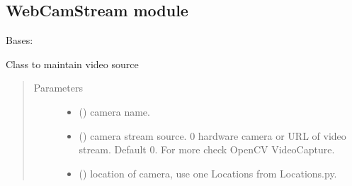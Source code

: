 \documentclass[letterpaper,10pt,english]{sphinxmanual}
\begin{document}
\subsection{WebCamStream module}
\label{\detokenize{doc/VideoStream/WebCamStream:module-WebCamStream}}\label{\detokenize{doc/VideoStream/WebCamStream:webcamstream-module}}\label{\detokenize{doc/VideoStream/WebCamStream::doc}}

\begin{fulllineitems}
\label{\detokenize{doc/VideoStream/WebCamStream:WebCamStream.WebCamStream}}
Bases: 

Class to maintain video source
\begin{quote}\begin{description}
\item[{Parameters}] \leavevmode\begin{itemize}
\item {} 
 () \textendash{} camera name.

\item {} 
 () \textendash{} camera stream source. 0 \sphinxhyphen{} hardware camera or URL of video stream. Default 0. For more check OpenCV VideoCapture.

\item {} 
 () \textendash{} location of camera, use one Locations from Locations.py.

\end{itemize}

\end{description}\end{quote}


\end{fulllineitems}
\end{document}
